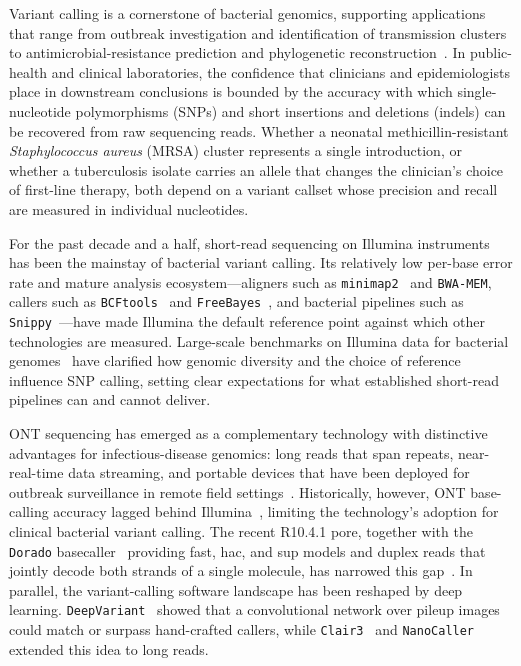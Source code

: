 \documentclass[11pt]{article}
\begin{document}
Variant calling is a cornerstone of bacterial genomics, supporting applications that range from outbreak investigation and identification of transmission clusters to antimicrobial-resistance prediction and phylogenetic reconstruction~\citep{didelot2012transforming,koser2012rapid,bush2020genomic}. In public-health and clinical laboratories, the confidence that clinicians and epidemiologists place in downstream conclusions is bounded by the accuracy with which single-nucleotide polymorphisms (SNPs) and short insertions and deletions (indels) can be recovered from raw sequencing reads. Whether a neonatal methicillin-resistant \emph{Staphylococcus aureus} (MRSA) cluster represents a single introduction, or whether a tuberculosis isolate carries an allele that changes the clinician's choice of first-line therapy, both depend on a variant callset whose precision and recall are measured in individual nucleotides.

For the past decade and a half, short-read sequencing on Illumina instruments has been the mainstay of bacterial variant calling. Its relatively low per-base error rate and mature analysis ecosystem---aligners such as \texttt{minimap2}~\citep{li2018minimap2} and \texttt{BWA-MEM}, callers such as \texttt{BCFtools}~\citep{danecek2021bcftools} and \texttt{FreeBayes}~\citep{garrison2012freebayes}, and bacterial pipelines such as \texttt{Snippy}~\citep{seemann_snippy}---have made Illumina the default reference point against which other technologies are measured. Large-scale benchmarks on Illumina data for bacterial genomes~\citep{bush2020genomic} have clarified how genomic diversity and the choice of reference influence SNP calling, setting clear expectations for what established short-read pipelines can and cannot deliver.

ONT sequencing has emerged as a complementary technology with distinctive advantages for infectious-disease genomics: long reads that span repeats, near-real-time data streaming, and portable devices that have been deployed for outbreak surveillance in remote field settings~\citep{quick2016realtime,amarasinghe2020opportunities}. Historically, however, ONT base-calling accuracy lagged behind Illumina~\citep{shafin2020nanopore}, limiting the technology's adoption for clinical bacterial variant calling. The recent R10.4.1 pore, together with the \texttt{Dorado} basecaller~\citep{oxfordnanopore_dorado} providing fast, hac, and sup models and duplex reads that jointly decode both strands of a single molecule, has narrowed this gap~\citep{sereika2022oxford,wick2023perfect}. In parallel, the variant-calling software landscape has been reshaped by deep learning. \texttt{DeepVariant}~\citep{poplin2018deepvariant} showed that a convolutional network over pileup images could match or surpass hand-crafted callers, while \texttt{Clair3}~\citep{zheng2022clair3} and \texttt{NanoCaller}~\citep{ahsan2021nanocaller} extended this idea to long reads.
\end{document}
